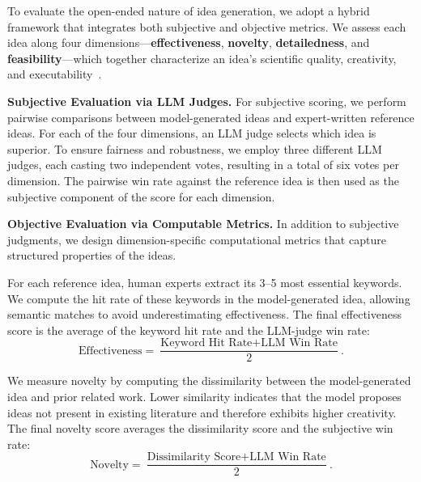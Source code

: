 To evaluate the open-ended nature of idea generation, we adopt a hybrid framework that integrates both subjective and objective metrics. We assess each idea along four dimensions---\textbf{effectiveness}, \textbf{novelty}, \textbf{detailedness}, and \textbf{feasibility}---which together characterize an idea's scientific quality, creativity, and executability~\cite{moose,ruan2025liveideabenchevaluatingllmsdivergent}.

\textbf{Subjective Evaluation via LLM Judges.}
For subjective scoring, we perform pairwise comparisons between model-generated ideas and expert-written reference ideas. For each of the four dimensions, an LLM judge selects which idea is superior. To ensure fairness and robustness, we employ three different LLM judges, each casting two independent votes, resulting in a total of six votes per dimension. The pairwise win rate against the reference idea is then used as the subjective component of the score for each dimension.

\textbf{Objective Evaluation via Computable Metrics.}
In addition to subjective judgments, we design dimension-specific computational metrics that capture structured properties of the ideas.

\begin{tcolorbox}[
    breakable,
    title=Metric Definition of Effectiveness,
    colback=LighterGray,
    colframe=DeepPurple,
    colbacktitle=DeepPurple,
    coltitle=White
]

For each reference idea, human experts extract its 3--5 most essential keywords. We compute the hit rate of these keywords in the model-generated idea, allowing semantic matches to avoid underestimating effectiveness. The final effectiveness score is the average of the keyword hit rate and the LLM-judge win rate:
\[
\text{Effectiveness} = \frac{\text{Keyword Hit Rate} + \text{LLM Win Rate}}{2}.
\]


\end{tcolorbox}


\begin{tcolorbox}[
    breakable,
    title=Metric Definition of Novelty,
    colback=LighterGray,
    colframe=DeepPurple,
    colbacktitle=DeepPurple,
    coltitle=White
]
We measure novelty by computing the dissimilarity between the model-generated idea and prior related work. Lower similarity indicates that the model proposes ideas not present in existing literature and therefore exhibits higher creativity. The final novelty score averages the dissimilarity score and the subjective win rate:
\[
\text{Novelty} = \frac{\text{Dissimilarity Score} + \text{LLM Win Rate}}{2}.
\]

\end{tcolorbox}


